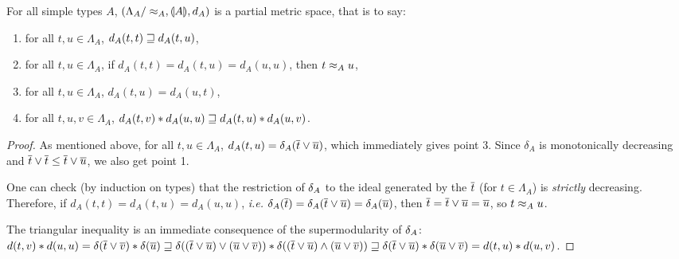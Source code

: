 \begin{corollary} \label{corollary:stlc-metric} For all simple types $A$, $\left(\Lambda_A/\approx_A, \llparenthesis A \rrparenthesis, d_A\right)$ is a partial metric space, that is to say:
\begin{enumerate}
\item for all $t,u \in \Lambda_A$, $d_A(t,t) \sqsupseteq d_A(t,u)$,
\item for all $t,u \in \Lambda_A$, if $d_A(t,t) = d_A(t,u) = d_A(u,u)$, then $t \approx_A u$,
\item for all $t,u \in \Lambda_A$, $d_A(t,u) = d_A(u,t)$,
\item for all $t,u,v \in \Lambda_A$, $d_A(t,v) \mathbin{\ast} d_A(u,u) \sqsupseteq d_A(t,u) \mathbin{\ast} d_A(u,v)$.
\end{enumerate}
\end{corollary}
\begin{proof}
As mentioned above, for all $t,u\in\Lambda_A$, $d_A(t,u) = \delta_A(\overline{t} \vee \overline{u})$, which immediately gives point 3. Since $\delta_A$ is monotonically decreasing and $\overline{t} \vee \overline{t} \leq \overline{t} \vee \overline{u}$, we also get point 1.

One can check (by induction on types) that the restriction of $\delta_A$ to the ideal generated by the $\overline{t}$ (for $t \in \Lambda_A$) is \emph{strictly} decreasing. Therefore, if  $d_A(t,t) = d_A(t,u) = d_A(u,u)$, \textit{i.e.} $\delta_A(\overline{t}) = \delta_A(\overline{t} \vee \overline{u}) = \delta_A(\overline{u})$,  then $\overline{t} = \overline{t} \vee \overline{u} = \overline{u}$, so $t \approx_A u$.

The triangular inequality is an immediate consequence of the supermodularity of $\delta_A$: $d(t,v) \mathbin{\ast} d(u,u) = \delta(\overline{t} \vee \overline{v}) \mathbin{\ast} \delta(\overline{u}) \sqsupseteq \delta((\overline{t} \vee \overline{u}) \vee (\overline{u} \vee \overline{v})) \mathbin{\ast} \delta((\overline{t} \vee \overline{u}) \wedge (\overline{u} \vee \overline{v})) \sqsupseteq \delta(\overline{t} \vee  \overline{u}) \mathbin{\ast} \delta(\overline{u} \vee  \overline{v}) = d(t,u) \mathbin{\ast} d(u,v)$.
\end{proof}



















